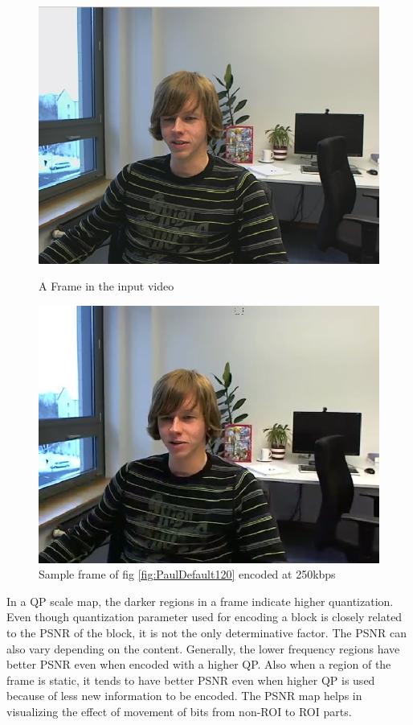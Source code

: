 \documentclass[11pt]{article} %
\begin{document}
\begin{figure}[!h]
    \centering
    \includegraphics[scale=0.5]{PaulDefault120}
    \caption{A Frame in the input video}
    \label{fig:PaulDefault120}
    \includegraphics[scale=0.5]{PaulDefault120_91250kbps}
    \caption{Sample frame of fig \ref{fig:PaulDefault120} encoded at 250kbps}
    \label{fig:PaulDefaultencoded}
\end{figure} 

In a QP scale map, the darker regions in a frame indicate higher quantization. Even though quantization parameter used for encoding a block is closely related to the PSNR of the block, it is not the only determinative factor. The PSNR can also vary depending on the content. Generally, the lower frequency regions have better PSNR even when encoded with a higher QP. Also when a region of the frame is static, it tends to have better PSNR even when higher QP is used because of less new information to be encoded. The PSNR map helps in visualizing the effect of movement of bits from non-ROI to ROI parts.
\end{document}
